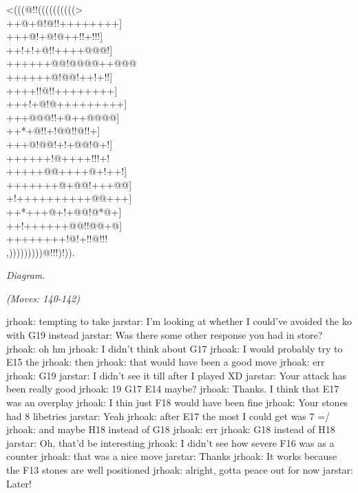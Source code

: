 \documentclass[letterpaper,12pt]{memoir}
\newcounter{GoFigure}[part]
\newcommand{\gofigure}{%
 \stepcounter{GoFigure}
 \centerline{\textit{Diagram.\thinspace\arabic{GoFigure}}}
}
\newcommand{\subtext}[1]{\centerline{\textit{#1}}}
\begin{document}
\begin{minipage}[t]{0.5\textwidth}
{\gnos
<(((@!!((((((((((>\\
++@+@!@!!++++++++]\\
+++@!+@!@++!!+!!!]\\
++!+!+@!!++++@@@!]\\
++++++@@!@@@@++@@@\\
++++++@!@@!++!+!!]\\
++++!!@!!++++++++]\\
+++!+@!@+++++++++]\\
+++@@@!!+@++@@@@]\\
++*+@!!+!@@!!@!!+]\\
+++@!@@!+!+@@!@+!]\\
++++++!@++++!!!+!\\
+++++@@++++@+!++!]\\
+++++++@+@@!+++@@]\\
+!++++++++++@@+++]\\
++*+++@+!+@@!@*@+]\\
++!++++++@@!!@@+@]\\
++++++++!@!+!!@!!!\\
,)))))))))@!!!)!)).\\
}
\gofigure

\subtext{(Moves: 140-142)}
\end{minipage}
\begin{minipage}[t]{0.5\textwidth}
\setlength{\parskip}{0.5em}
jrhoak: tempting to take
jarstar: I'm looking at whether I could've avoided the ko with G19 instead
jarstar: Was there some other response you had in store?
jrhoak: oh hm
jrhoak: I didn't think about G17
jrhoak: I would probably try to E15 the
jrhoak: then
jrhoak: that would have been a good move
jrhoak: err
jrhoak: G19
jarstar: I didn't see it till after I played XD
jarstar: Your attack has been really good
jrhoak: 19 G17 E14 maybe?
jrhoak: Thanks.  I think that E17 was an overplay
jrhoak: I thin just F18 would have been fine
jrhoak: Your stones had 8 libetries
jarstar: Yeah
jrhoak: after E17 the most I could get was 7 =/
jrhoak: and maybe H18 instead of G18
jrhoak: err
jrhoak: G18 instead of H18
jarstar: Oh, that'd be interesting
jrhoak: I didn't see how severe F16 was as a counter
jrhoak: that was a nice move
jarstar: Thanks
jrhoak: It works because the F13 stones are well positioned
jrhoak: alright, gotta peace out for now
jarstar: Later!


\end{minipage}
\vfill
\end{document}
